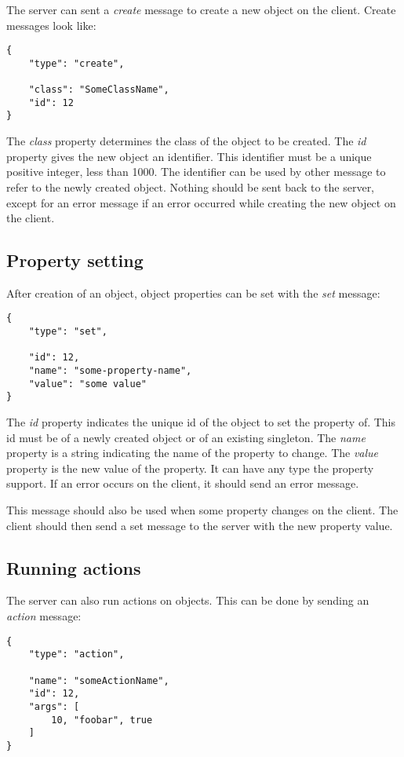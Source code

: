 \documentclass[11pt]{article}
\begin{document}
The server can sent a \textit{create} message to create a new object on the client.
Create messages look like:

\begin{verbatim}
{
    "type": "create",
    
    "class": "SomeClassName",
    "id": 12
}
\end{verbatim}

The \textit{class} property determines the class of the object to be created.
The \textit{id} property gives the new object an identifier.
This identifier must be a unique positive integer, less than 1000.
The identifier can be used by other message to refer to the newly created object.
Nothing should be sent back to the server, except for an error message if an error occurred while creating the new object on the client.

\subsection{Property setting}

After creation of an object, object properties can be set with the \textit{set} message:

\begin{verbatim}
{
    "type": "set",
    
    "id": 12,
    "name": "some-property-name",
    "value": "some value"
}
\end{verbatim}

The \textit{id} property indicates the unique id of the object to set the property of.
This id must be of a newly created object or of an existing singleton.
The \textit{name} property is a string indicating the name of the property to change.
The \textit{value} property is the new value of the property.
It can have any type the property support.
If an error occurs on the client, it should send an error message.

This message should also be used when some property changes on the client.
The client should then send a set message to the server with the new property value.

\subsection{Running actions}

The server can also run actions on objects.
This can be done by sending an \textit{action} message:

\begin{verbatim}
{
    "type": "action",

    "name": "someActionName",
    "id": 12,
    "args": [
        10, "foobar", true
    ]
}
\end{verbatim}
\end{document}
